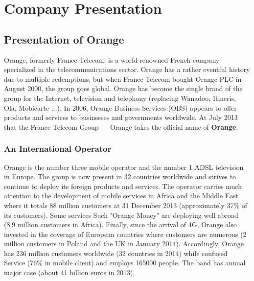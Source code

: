 
\chapter{Company Presentation} %

\label{Chapter2} %




\section{Presentation of Orange}
Orange, formerly France Telecom\cite{benilde2010portrait}, is a world-renowned French company specialized in the telecommunications sector. Orange has a rather eventful history due to multiple redemptions, but when France Telecom bought Orange PLC in August 2000, the group goes global. Orange has become the single brand of the group for the Internet, television and telephony (replacing Wanadoo, Itineris, Ola, Mobicarte ...). In 2006, Orange Business Services (OBS) appears to offer products and services to businesses and governments worldwide. At July 2013 that the France Telecom Group --- Orange takes the official name of \textbf{Orange}\cite{bertolus2003qui}.

\subsection{An International Operator}
Orange is the number three mobile operator and the number 1 ADSL television in Europe. The group is now present in 32 countries worldwide and strives to continue to deploy its foreign products and services. The operator carries much attention to the development of mobile services in Africa\cite{jaffre2005afrique} and the Middle East where it totals 88 million customers at 31 December 2013 (approximately 37\% of its customers). Some services Such "Orange Money" are deploying well abroad (8.9 million customers in Africa). Finally, since the arrival of 4G, Orange also invested in the coverage of European countries where customers are numerous (2 million customers in Poland and the UK in January 2014). Accordingly, Orange has 236 million customers worldwide (32 countries in 2014) while confused Service (76\% in mobile client) and employs 165000 people. The band has annual major case (about 41 billion euros in 2013).


